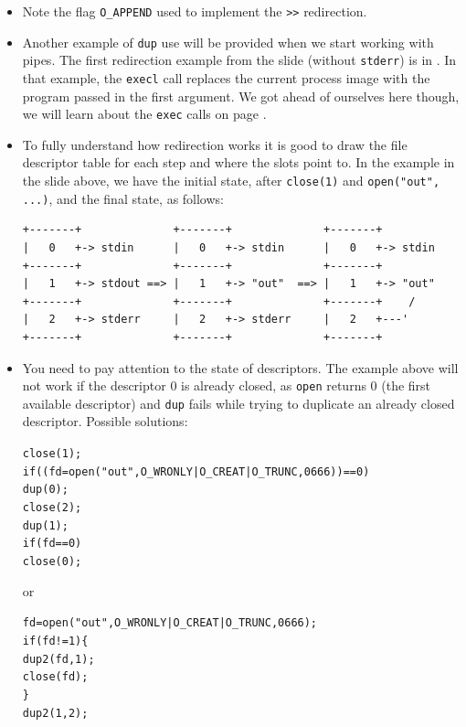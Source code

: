 \begin{itemize}
\item Note the flag \texttt{O\_APPEND} used to implement the \texttt{>>}
redirection.
\item {} Another example of \texttt{dup} use will be provided when
we start working with pipes.  The first redirection example from the slide
(without \texttt{stderr}) is in .  In that example, the
\texttt{execl} call replaces the current process image with the
program passed in the first argument.  We got ahead of ourselves here though, we
will learn about the \texttt{exec} calls on page \pageref{EXEC}.
\item To fully understand how redirection works it is good to draw the file
descriptor table for each step and where the slots point to.  In
the  example in the slide above, we have the initial state, after
\texttt{close(1)} and \texttt{open("out", ...)}, and the final state, as
follows:

\begin{verbatim}
+-------+              +-------+              +-------+
|   0   +-> stdin      |   0   +-> stdin      |   0   +-> stdin
+-------+              +-------+              +-------+
|   1   +-> stdout ==> |   1   +-> "out"  ==> |   1   +-> "out"
+-------+              +-------+              +-------+    /
|   2   +-> stderr     |   2   +-> stderr     |   2   +---'
+-------+              +-------+              +-------+
\end{verbatim}

\item You need to pay attention to the state of descriptors. The  example
above will not work if the descriptor 0 is already closed, as 
\texttt{open} returns 0 (the first available descriptor) and \texttt{dup} fails
while trying to duplicate an already closed descriptor.  Possible
solutions:

\begin{alltt}
close(1);
if ((fd = open("out", O\_WRONLY | O\_CREAT | O\_TRUNC, 0666)) == 0)
        dup(0);
close(2);
dup(1);
if (fd == 0)
        close(0);
\end{alltt}

or

\begin{alltt}
fd = open("out", O\_WRONLY | O\_CREAT | O\_TRUNC, 0666);
if (fd != 1) \{
        dup2(fd, 1);
        close(fd);
\}
dup2(1, 2);
\end{alltt}
\end{itemize}

